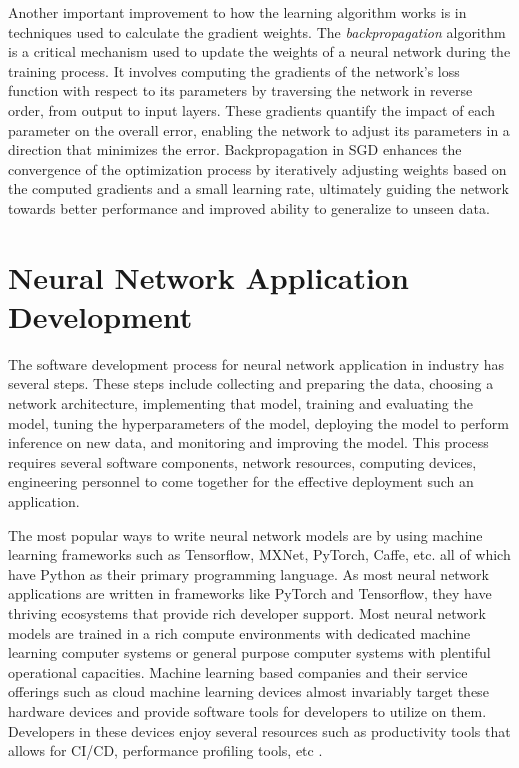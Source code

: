 Another important improvement to how the learning algorithm works is in techniques used to calculate the gradient weights. The \textit{backpropagation} algorithm is a critical mechanism used to update the weights of a neural network during the training process. It involves computing the gradients of the network's loss function with respect to its parameters by traversing the network in reverse order, from output to input layers. These gradients quantify the impact of each parameter on the overall error, enabling the network to adjust its parameters in a direction that minimizes the error. Backpropagation in SGD enhances the convergence of the optimization process by iteratively adjusting weights based on the computed gradients and a small learning rate, ultimately guiding the network towards better performance and improved ability to generalize to unseen data.

\section{Neural Network Application Development}

The software development process for neural network application in industry has several steps. These steps include collecting and preparing the data, choosing a network architecture, implementing that model, training and evaluating the model, tuning the hyperparameters of the model, deploying the model to perform inference on new data, and monitoring and improving the model. This process requires several software components, network resources, computing devices, engineering personnel to come together for the effective deployment such an application.

The most popular ways to write neural network models are by using machine learning frameworks such as Tensorflow, MXNet, PyTorch, Caffe, etc. all of which have Python as their primary programming language. As most neural network applications are written in frameworks like PyTorch and Tensorflow, they have thriving ecosystems that provide rich developer support. Most neural network models are trained in a rich compute environments with dedicated machine learning computer systems or general purpose computer systems with plentiful operational capacities. Machine learning based companies and their service offerings such as cloud machine learning devices almost invariably target these hardware devices and provide software tools for developers to utilize on them. Developers in these devices enjoy several resources such as productivity tools that allows for CI/CD, performance profiling tools, etc \cite{Saucedo_Awesome_Production_Machine}.

